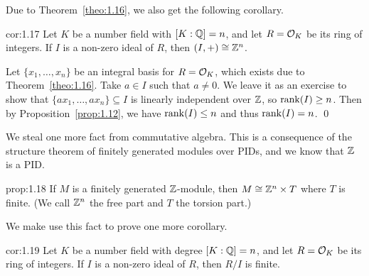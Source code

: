 Due to Theorem~\ref{theo:1.16}, we also get the following corollary. 

\begin{cor}{cor:1.17}
    Let $K$ be a number field with $[K : \mathbb{Q}] = n$, and let $R = {\cal O}_K$ be 
    its ring of integers. If $I$ is a non-zero ideal of $R$, then 
    $(I, +) \cong \mathbb{Z}^n$. 
\end{cor}
\begin{pf}
    Let $\{x_1, \dots, x_n\}$ be an integral basis for $R = {\cal O}_K$, 
    which exists due to Theorem~\ref{theo:1.16}. Take $a \in I$ such that 
    $a \neq 0$. We leave it as an exercise to show that 
    $\{ax_1, \dots, ax_n\} \subseteq I$ is linearly independent over $\mathbb{Z}$, 
    so $\operatorname{rank}(I) \geq n$. Then by Proposition~\ref{prop:1.12}, we have 
    $\operatorname{rank}(I) \leq n$ and thus $\operatorname{rank}(I) = n$. \qed 
\end{pf}\vspace{-0.25cm}

We steal one more fact from commutative algebra. This is a consequence of the 
structure theorem of finitely generated modules over PIDs, and we know that 
$\mathbb{Z}$ is a PID.

\begin{prop}{prop:1.18}
    If $M$ is a finitely generated $\mathbb{Z}$-module, then $M \cong \mathbb{Z}^n \times T$ 
    where $T$ is finite. (We call $\mathbb{Z}^n$ the free part and $T$ the 
    torsion part.)
\end{prop}

We make use this fact to prove one more corollary.

\begin{cor}{cor:1.19}
    Let $K$ be a number field with degree $[K : \mathbb{Q}] = n$, and let 
    $R = {\cal O}_K$ be its ring of integers. 
    If $I$ is a non-zero ideal of $R$, then $R/I$ is finite. 
\end{cor}   